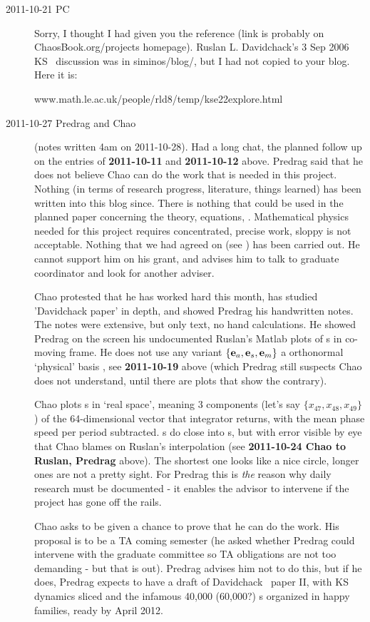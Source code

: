 \begin{description}
\item[2011-10-21 PC] Sorry, I thought I had given you the reference (link
is probably on ChaosBook.org/projects homepage). Ruslan L. Davidchack's 3
Sep 2006 KS \eqva\ discussion was in siminos/blog/, but I had not copied
to your blog. Here it is:

{www.math.le.ac.uk/people/rld8/temp/kse22explore.html}

\item[2011-10-27 Predrag and Chao] (notes written 4am on 2011-10-28). Had
a long chat, the planned follow up on the entries of {\bf 2011-10-11} and
{\bf 2011-10-12} above. Predrag said that he does not believe Chao can do
the work that is needed in this project. Nothing (in terms of research
progress, literature, things learned) has been written into this blog
since. There is nothing that could be used in the planned paper
concerning the theory, equations, \etc. Mathematical physics needed for
this project requires concentrated, precise work, sloppy is not
acceptable. Nothing that we had agreed on (see ) has
been carried out. He cannot support him on his grant, and advises him to
talk to graduate coordinator and look for another adviser.

Chao protested that he has worked hard this month, has studied
'Davidchack paper' in depth, and showed Predrag his handwritten
notes. The notes were extensive, but only text, no hand calculations. He
showed Predrag on the screen his undocumented Ruslan's Matlab plots of
\rpo s in co-moving frame. He does not use any variant $\{{\bf e}_a, {\bf e}_s,
{\bf e}_m\}$ a orthonormal `physical' basis , see {\bf
2011-10-19} above (which Predrag still suspects Chao does not
understand, until there are plots that show the contrary).

Chao plots \rpo s in `real space', meaning 3 components (let's
say $\{x_{47}, x_{48}, x_{49}\}$) of the 64-dimensional vector that
integrator returns, with the mean phase speed per period subtracted. \Rpo
s do close into \po s, but with error visible by eye that Chao blames on
Ruslan's interpolation (see {\bf 2011-10-24 Chao to Ruslan, Predrag}
above). The shortest one looks like a nice circle, longer ones are not a
pretty sight. For Predrag this is \emph{the} reason why daily research
must be documented - it enables the advisor to intervene if the project
has gone off the rails.

Chao asks to be given a chance to prove that he can do the work. His
proposal is to be a TA coming semester (he asked whether Predrag could
intervene with the graduate committee so TA obligations are not too
demanding - but that is out). Predrag advises him not to do this, but if
he does, Predrag expects to have a draft of Davidchack \etal\ paper
II, with KS dynamics sliced and the infamous 40,000 (60,000?) \rpo s
organized in happy families, ready by April 2012.


\end{description}
